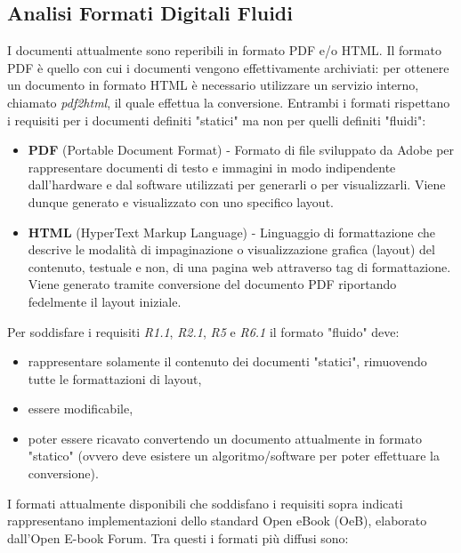 \subsection{Analisi Formati Digitali Fluidi}
I documenti attualmente sono reperibili in formato PDF e/o HTML. Il formato PDF è quello con cui i documenti vengono effettivamente archiviati: per ottenere un documento in formato HTML è necessario utilizzare un servizio interno, chiamato \textit{pdf2html}, il quale effettua la conversione. Entrambi i formati rispettano i requisiti per i documenti definiti "statici" ma non per quelli definiti "fluidi":
\begin{itemize}
    \item \textbf{PDF} (Portable Document Format) - Formato di file sviluppato da Adobe per rappresentare documenti di testo e immagini in modo indipendente dall'hardware e dal software utilizzati per generarli o per visualizzarli. Viene dunque generato e visualizzato con uno specifico layout.
    \item \textbf{HTML} (HyperText Markup Language) - Linguaggio di formattazione che descrive le modalità di impaginazione o visualizzazione grafica (layout) del contenuto, testuale e non, di una pagina web attraverso tag di formattazione. Viene generato tramite conversione del documento PDF riportando fedelmente il layout iniziale.
\end{itemize}
Per soddisfare i requisiti \textit{R1.1}, \textit{R2.1}, \textit{R5} e \textit{R6.1} il formato "fluido" deve:
\begin{itemize}
    \item rappresentare solamente il contenuto dei documenti "statici", rimuovendo tutte le formattazioni di layout,
    \item essere modificabile,
    \item poter essere ricavato convertendo un documento attualmente in formato "statico" (ovvero deve esistere un algoritmo/software per poter effettuare la conversione).
\end{itemize}
I formati attualmente disponibili che soddisfano i requisiti sopra indicati rappresentano implementazioni dello standard Open eBook (OeB), elaborato dall'Open E-book Forum. Tra questi i formati più diffusi sono:
